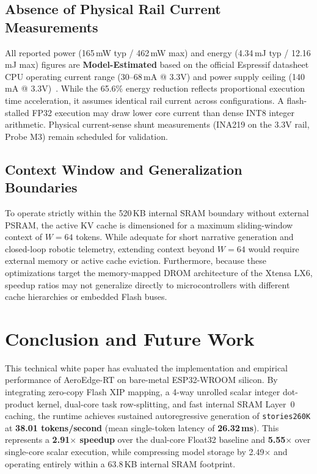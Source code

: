 \documentclass[10pt,a4paper]{article}
\begin{document}
\subsection{Absence of Physical Rail Current Measurements}
All reported power (165\,mW typ / 462\,mW max) and energy (4.34\,mJ typ / 12.16\,mJ max) figures are \textbf{Model-Estimated} based on the official Espressif datasheet CPU operating current range (30--68\,mA @ 3.3V) and power supply ceiling (140\,mA @ 3.3V)~\cite{espressif2024esp32datasheet}. While the 65.6\% energy reduction reflects proportional execution time acceleration, it assumes identical rail current across configurations. A flash-stalled FP32 execution may draw lower core current than dense INT8 integer arithmetic. Physical current-sense shunt measurements (INA219 on the 3.3V rail, Probe M3) remain scheduled for validation.

\subsection{Context Window and Generalization Boundaries}
To operate strictly within the 520\,KB internal SRAM boundary without external PSRAM, the active KV cache is dimensioned for a maximum sliding-window context of $W=64$ tokens. While adequate for short narrative generation and closed-loop robotic telemetry, extending context beyond $W=64$ would require external memory or active cache eviction. Furthermore, because these optimizations target the memory-mapped DROM architecture of the Xtensa LX6, speedup ratios may not generalize directly to microcontrollers with different cache hierarchies or embedded Flash buses.

\section{Conclusion and Future Work}
\label{sec:conclusion}

This technical white paper has evaluated the implementation and empirical performance of AeroEdge-RT on bare-metal ESP32-WROOM silicon. By integrating zero-copy Flash XIP mapping, a 4-way unrolled scalar integer dot-product kernel, dual-core task row-splitting, and fast internal SRAM Layer~0 caching, the runtime achieves sustained autoregressive generation of \texttt{stories260K} at \textbf{38.01 tokens/second} (mean single-token latency of \textbf{26.32\,ms}). This represents a \textbf{2.91$\times$ speedup} over the dual-core Float32 baseline and \textbf{5.55$\times$} over single-core scalar execution, while compressing model storage by 2.49$\times$ and operating entirely within a 63.8\,KB internal SRAM footprint.
\end{document}
